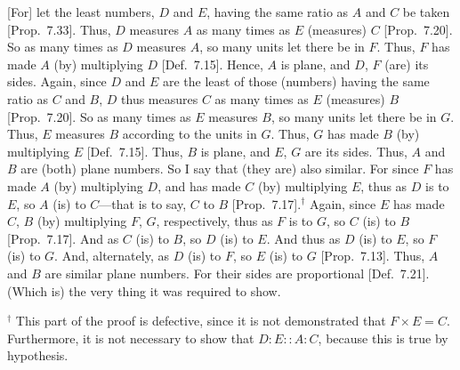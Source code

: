 \begin{Parallel}{}{}
{\epsfysize=1in
\centerline{}

\mbox{[}For] let the least numbers, $D$ and $E$,  having the same ratio as $A$ and $C$ be taken [Prop.~7.33]. Thus,
$D$ measures $A$ as many  times as  $E$ (measures) $C$
[Prop.~7.20]. So as many times as $D$ measures $A$, so many units let there be in $F$. Thus, $F$ has made $A$ (by)
multiplying $D$ [Def.~7.15]. Hence, $A$ is 
plane, and $D$, $F$ (are) its sides. Again, since $D$ and $E$
are the least of those (numbers) having  the same ratio as $C$ and $B$, 
$D$ thus measures $C$ as many times as $E$ (measures) $B$ [Prop.~7.20]. So as many times as $E$ measures
$B$, so many units let there be in $G$. Thus, $E$ measures $B$ according to
the units in $G$. Thus, $G$ has made $B$ (by) multiplying $E$ [Def.~7.15]. Thus, $B$ is plane, and $E$, $G$ are its sides. Thus, $A$ and $B$ are (both) plane numbers. So I say that
(they are) also similar. For since $F$ has made $A$ (by) multiplying $D$,
and has made $C$ (by) multiplying $E$, thus as $D$ is to $E$, so $A$ (is) to $C$---that is to say, $C$ to $B$ [Prop.~7.17].$^\dag$ Again, since $E$ has made  $C$, $B$ (by)
multiplying  $F$, $G$, respectively, thus as $F$ is to $G$, so $C$ (is) to
$B$ [Prop.~7.17]. And as $C$ (is) to $B$, so
$D$ (is) to $E$. And thus as $D$ (is) to $E$, so $F$ (is) to $G$. And,
alternately, as $D$ (is) to $F$, so $E$ (is) to $G$ [Prop.~7.13]. Thus, $A$ and $B$ are similar plane
numbers. For their sides are proportional [Def.~7.21].
(Which is) the very thing it was required to show.}
\end{Parallel}
{\footnotesize\noindent$^\dag$ This part of the proof is defective, since it is not demonstrated that $F\times E = C$. Furthermore, it is
not necessary to show that $D:E::A:C$, because this
is true by hypothesis.}

